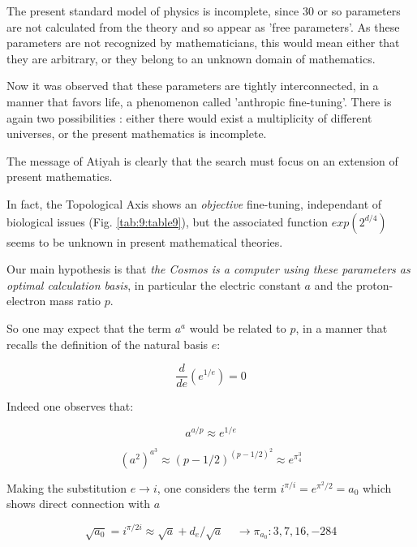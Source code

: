 \documentclass[a4paper,9pt]{article}
\begin{document}
         The present standard model of physics is incomplete, since 30 or so parameters are not calculated from the theory and so appear as 'free parameters'. As these parameters are not recognized by mathematicians, this would mean either that they are arbitrary, or they belong to an unknown domain of mathematics. 
         
         
         Now it was observed that these parameters are tightly interconnected, in a manner that favors life, a phenomenon called 'anthropic fine-tuning'. There is again two possibilities : either there would exist a multiplicity of different universes, or the present mathematics is incomplete.
         
         
         The message of Atiyah is clearly that the search must focus on an extension of present mathematics.
         
         
         In fact, the Topological Axis shows an \textit {objective} fine-tuning, independant of biological issues (Fig. \ref{tab:9:table9}), but the associated function $exp(2^{d/4})$ seems to be unknown in present mathematical theories.
   
         
         
         Our main hypothesis is that \textit {the Cosmos is a computer using these parameters as optimal calculation basis},
         in particular the electric constant $a$ and the proton-electron mass ratio $p$.
         
         
        So one may expect that the term $a^a$ would be related to $p$, in a manner that recalls the definition of the natural basis $e$:
         
\begin{equation}
\frac{d}{de}(e^{1/e}) = 0 
\end{equation}

   Indeed one observes that:
   
 \begin{equation}
 a^{a/p} \approx e^{1/e} 
 \end{equation}
 
 \begin{equation}
 (a^2)^{a^3} \approx (p-1/2)^{(p-1/2)^2} \approx e^{\pi_4^3}
\end{equation}

Making the substitution $e \to i$, one considers the term $i^{\pi/i} = e^{\pi^2/2} = a_0$ which shows direct connection with $a$
   
\begin{equation}
\sqrt{a_0} = i^{\pi/2i} \approx \sqrt a + d_e/ \sqrt a ~~~~~\rightarrow \pi_{a_0} : 3, 7, 16, -284
\end{equation}
 
\end{document}
